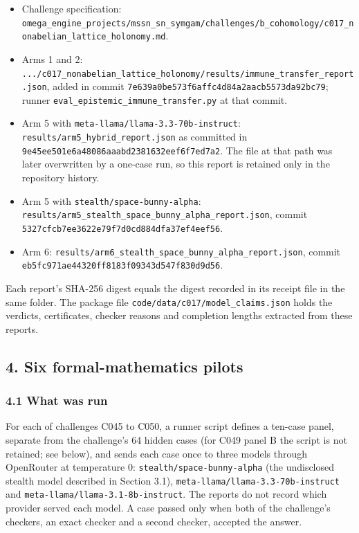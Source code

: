 \documentclass[
  11pt,
]{article}
\providecommand{\tightlist}{%
  \setlength{\itemsep}{0pt}\setlength{\parskip}{0pt}}
\begin{document}
\begin{itemize}
\tightlist
\item
  Challenge specification:
  \nolinkurl{omega_engine_projects/mssn_sn_symgam/challenges/b_cohomology/c017_nonabelian_lattice_holonomy.md}.
\item
  Arms 1 and 2:
  \nolinkurl{.../c017_nonabelian_lattice_holonomy/results/immune_transfer_report.json},
  added in commit \nolinkurl{7e639a0be573f6affc4d84a2aacb5573da92bc79};
  runner \nolinkurl{eval_epistemic_immune_transfer.py} at that commit.
\item
  Arm 5 with \nolinkurl{meta-llama/llama-3.3-70b-instruct}:
  \nolinkurl{results/arm5_hybrid_report.json} as committed in
  \nolinkurl{9e45ee501e6a48086aaabd2381632eef6f7ed7a2}. The file at that
  path was later overwritten by a one-case run, so this report is
  retained only in the repository history.
\item
  Arm 5 with \nolinkurl{stealth/space-bunny-alpha}:
  \nolinkurl{results/arm5_stealth_space_bunny_alpha_report.json}, commit
  \nolinkurl{5327cfcb7ee3622e79f7d0cd884dfa37ef4eef56}.
\item
  Arm 6: \nolinkurl{results/arm6_stealth_space_bunny_alpha_report.json},
  commit \nolinkurl{eb5fc971ae44320ff8183f09343d547f830d9d56}.
\end{itemize}

Each report's SHA-256 digest equals the digest recorded in its receipt
file in the same folder. The package file
\nolinkurl{code/data/c017/model_claims.json} holds the verdicts,
certificates, checker reasons and completion lengths extracted from
these reports.

\subsection{4. Six formal-mathematics
pilots}\label{six-formal-mathematics-pilots}

\subsubsection{4.1 What was run}\label{what-was-run-1}

For each of challenges C045 to C050, a runner script defines a ten-case
panel, separate from the challenge's 64 hidden cases (for C049 panel B
the script is not retained; see below), and sends each case once to
three models through OpenRouter at temperature 0:
\nolinkurl{stealth/space-bunny-alpha} (the undisclosed stealth model
described in Section 3.1), \nolinkurl{meta-llama/llama-3.3-70b-instruct}
and \nolinkurl{meta-llama/llama-3.1-8b-instruct}. The reports do not
record which provider served each model. A case passed only when both of
the challenge's checkers, an exact checker and a second checker,
accepted the answer.
\end{document}
